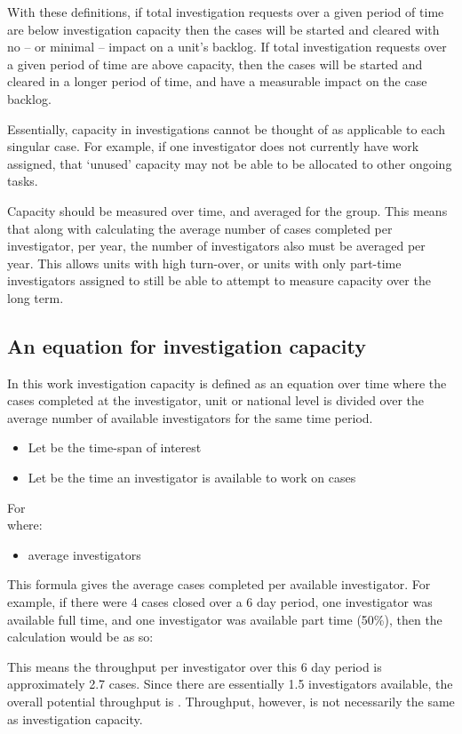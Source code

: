 \documentclass[10pt,a4paper]{article}
\begin{document}
With these definitions, if total investigation requests over a given period of time are below investigation capacity then the cases will be started and cleared with no -- or minimal -- impact on a unit's backlog. If total investigation requests over a given period of time are above capacity, then the cases will be started and cleared in a longer period of time, and have a measurable impact on the case backlog.

Essentially, capacity in investigations cannot be thought of as applicable to each singular case. For example, if one investigator does not currently have work assigned, that `unused' capacity may not be able to be allocated to other ongoing tasks.

Capacity should be measured over time, and averaged for the group. This means that along with calculating the average number of cases completed per investigator, per year, the number of investigators also must be averaged per year. This allows units with high turn-over, or units with only part-time investigators assigned to still be able to attempt to measure capacity over the long term.

\subsection{An equation for investigation capacity}
In this work investigation capacity is defined as an equation over time where the cases completed at the investigator, unit or national level is divided over the average number of available investigators for the same time period.

\begin{itemize}
\item Let  be the time-span of interest
\item Let  be the time an investigator is available to work on cases
\end{itemize}

For \\
\noindent where:
\begin{itemize}
\item average investigators 
\end{itemize}

This formula gives the average cases completed per available investigator. For example, if there were 4 cases closed over a 6 day period, one investigator was available full time, and one investigator was available part time (50\%), then the calculation would be as so: 

This means the throughput per investigator over this 6 day period is approximately 2.7 cases. Since there are essentially 1.5 investigators available, the overall potential throughput is . Throughput, however, is not necessarily the same as investigation capacity.
\end{document}
